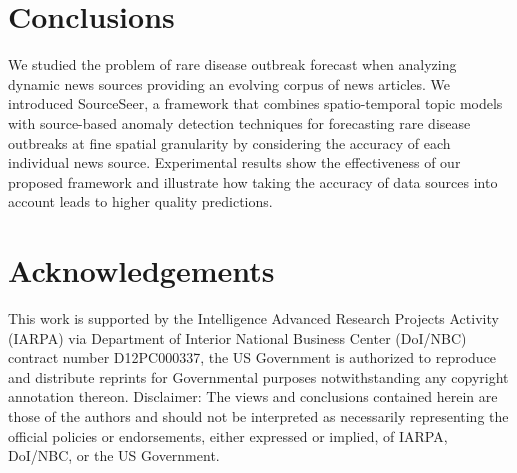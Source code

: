\documentclass[twoside,leqno,twocolumn]{article}
\newcommand{\fullmodel}{{{\sf SourceSeer}}\xspace}
\begin{document}
\section{Conclusions}
\label{sec:conclusion}
We studied the problem of rare disease outbreak forecast when analyzing dynamic news sources providing an evolving corpus of news articles. We introduced \fullmodel, a framework that combines spatio-temporal topic models with source-based anomaly detection techniques for forecasting rare disease outbreaks at fine spatial granularity by considering the accuracy of each individual news source. Experimental results show the effectiveness of our proposed framework and illustrate how taking the accuracy of data sources into account leads to higher quality predictions.

\vspace{-5pt}\section*{Acknowledgements}
This work is supported by the Intelligence Advanced Research Projects Activity (IARPA) via Department of Interior National Business Center (DoI/NBC) contract number D12PC000337, the US Government is authorized to reproduce and distribute reprints for Governmental purposes notwithstanding any copyright annotation thereon. Disclaimer: The views and conclusions contained herein are those of the authors and should
not be interpreted as necessarily representing the official policies or endorsements, either expressed or implied, of IARPA, DoI/NBC, or the
US Government.

\balance




\clearpage
\appendix
\end{document}
